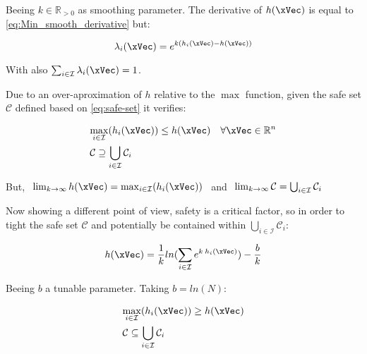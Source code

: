 \begin{description}
    Beeing \(k \in \mathbb{R}_{>0}\) as smoothing parameter. The derivative of \(h(\xVec)\) is equal to \ref{eq:Min_smooth_derivative} but:

    \begin{equation}
        \lambda_i(\xVec) = e^{k(h_i(\xVec)-h(\xVec))}
        \label{eq:Max_lambda_smoothFunc}
    \end{equation}

    With also \(\sum_{i \in \mathcal{I}} \lambda_i(\xVec) = 1\). \par
    Due to an over-aproximation of \(h\) relative to the \(\max\) function, given the safe set \(\mathcal{C}\) defined based on \ref{eq:safe-set} it verifies:

    \begin{subequations}
        \begin{align}
            &\underset{i \in \mathcal{I}}{\max} (h_i(\xVec)) \leq h(\xVec) \quad \forall \xVec \in \mathbb{R}^n 
            \label{eq:Union_CBF_Comparation} \\
            &\mathcal{C} \supseteq \bigcup_{i \in \mathcal{I}} \mathcal{C}_i
            \label{eq:Union_SafeSet_Comparation}
        \end{align}
    \end{subequations}

    But, \(\hspace{0.4em} \lim_{k \to \infty} h(\xVec) = {\max}_{i \in \mathcal{I}} (h_i(\xVec)) \hspace{0.4em}\) and \( \hspace{0.4em} \lim_{k \to \infty} \mathcal{C} = \bigcup_{i \in \mathcal{I}} \mathcal{C}_i\) \par

    Now showing a different point of view, safety is a critical factor, so in order to tight the safe set \(\mathcal{C}\) and potentially be contained within \( \bigcup_{i \in \mathcal{I}} \mathcal{C}_i\): 
    
    \begin{equation}
        h(\xVec) = \frac{1}{k}ln(\sum_{i \in \mathcal{I}} e^{k \hspace{0.2em} h_i(\xVec)}) - \frac{b}{k}
        \label{eq:Max_smoothFunc_tighted} \\  
    \end{equation}

    Beeing \(b\) a tunable parameter. Taking \(b = ln (N)\):

    \begin{subequations}
        \begin{align}
            &\underset{i \in \mathcal{I}}{\max} (h_i(\xVec)) \geq h(\xVec) %
            \label{eq:Union_CBF_Comparation_tighted} \\
            &\mathcal{C} \subseteq \bigcup_{i \in \mathcal{I}} \mathcal{C}_i
            \label{eq:Union_SafeSet_Comparation_tighted}
        \end{align}
    \end{subequations}


\end{description}
